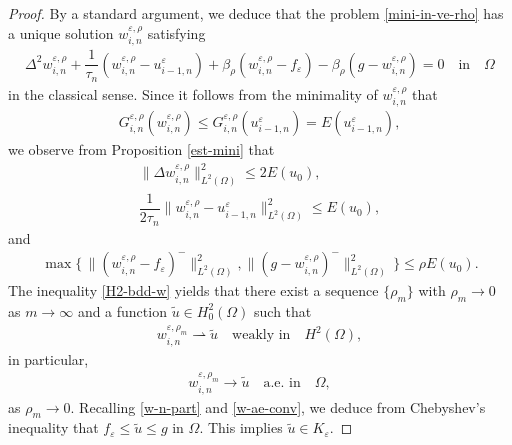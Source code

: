 \documentclass[12pt]{amsart}
\begin{document}
\begin{proof}
By a standard argument, we deduce that the problem \eqref{mini-in-ve-rho} has a unique solution $w^{{\varepsilon},\rho}_{i,n}$ satisfying 
\begin{align*}
\Delta^{2} w^{{\varepsilon},\rho}_{i,n} + \dfrac{1}{\tau_{n}} (w^{{\varepsilon},\rho}_{i,n} - u^{\varepsilon}_{i-1,n}) 
  + {\beta}_{\rho}(w^{{\varepsilon},\rho}_{i,n} - f_{\varepsilon}) - {\beta}_{\rho}(g - w^{{\varepsilon},\rho}_{i,n}) = 0 \quad \text{in} \quad \Omega
\end{align*}
in the classical sense. Since it follows from the minimality of $w^{{\varepsilon},\rho}_{i,n}$ that 
\begin{align} \label{Gw-Eu}
G^{{\varepsilon},\rho}_{i,n}(w^{{\varepsilon},\rho}_{i,n}) 
\le G^{{\varepsilon},\rho}_{i,n}(u^{\varepsilon}_{i-1,n}) 
= E(u^{\varepsilon}_{i-1,n}), 
\end{align}
we observe from Proposition \ref{est-mini} that 
\begin{gather}
\| \Delta w^{{\varepsilon},\rho}_{i,n} \|_{L^{2}(\Omega)}^{2} \le 2 E(u_{0}), \label{H2-bdd-w} \\
\dfrac{1}{2 \tau_{n}} \| w^{{\varepsilon},\rho}_{i,n} - u^{\varepsilon}_{i-1,n} \|_{L^{2}(\Omega)}^{2} \le E(u_{0}), 
\end{gather}
and 
\begin{align} \label{w-n-part}
\max \{\, \| (w^{{\varepsilon},\rho}_{i,n} - f_{\varepsilon})^{-} \|_{L^{2}(\Omega)}^{2}, \| (g - w^{{\varepsilon},\rho}_{i,n})^{-} \|_{L^{2}(\Omega)}^{2} \,\} 
\le \rho E(u_{0}). 
\end{align}
The inequality \eqref{H2-bdd-w} yields that there exist a sequence $\{ \rho_{m}\}$ with $\rho_{m} \to 0$ as $m \to \infty$ and 
a function $\tilde{u} \in H^{2}_{0}(\Omega)$ such that 
\begin{align} \label{w-weak}
w^{{\varepsilon},\rho_{m}}_{i,n} \rightharpoonup \tilde{u} \quad \text{weakly in} \quad H^{2}(\Omega), 
\end{align}
in particular, 
\begin{align} \label{w-ae-conv}
w^{{\varepsilon},\rho_{m}}_{i,n} \to \tilde{u} \quad \text{a.e. in}\quad \Omega, 
\end{align}
as $\rho_{m} \to 0$. Recalling \eqref{w-n-part} and \eqref{w-ae-conv}, we deduce from Chebyshev's inequality that 
$f_{\varepsilon} \le \tilde{u} \le g$ in $\Omega$. This implies $\tilde{u} \in K_{\varepsilon}$. 


\end{proof}
\end{document}
